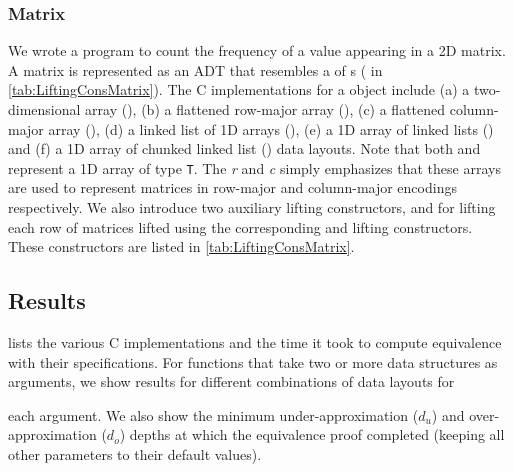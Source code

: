\subsubsection{Matrix}
We wrote a
\SpecL{} program to count the frequency of a value appearing in a 2D matrix.
A matrix is represented as an ADT that resembles a  of s ( in \cref{tab:LiftingConsMatrix}).
The C implementations for a  object include
(a) a two-dimensional array (), (b) a flattened row-major array (),
(c) a flattened column-major array (), (d) a linked list of 1D arrays (),
(e) a 1D array of linked lists () and (f) a 1D array of chunked linked list ()
data layouts. Note that both  and  represent a 1D array of type {\tt T}. The {\em r} and {\em c} simply
emphasizes that these arrays are used to represent matrices in row-major and column-major encodings respectively.
We also introduce two auxiliary lifting constructors,  and 
for lifting each row of matrices lifted using the corresponding  and   lifting
constructors. These constructors are listed in \cref{tab:LiftingConsMatrix}.
\subsection{Results}

 lists the various C implementations and the time it took
to compute equivalence with their specifications. For functions that
take two or more data structures as arguments, we show
results for different combinations of data layouts for {\parfillskip=0pt\par}

\noindent each argument.
We also show the minimum under-approximation ($d_u$) and over-approximation ($d_o$) depths
at which the equivalence proof completed (keeping all other parameters to their
default values).

